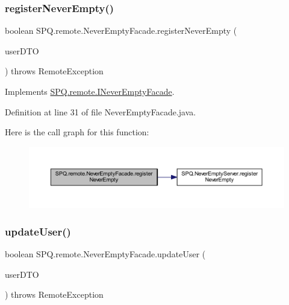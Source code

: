 \subsubsection{\texorpdfstring{register\+Never\+Empty()}{registerNeverEmpty()}}
{\footnotesize\ttfamily boolean S\+P\+Q.\+remote.\+Never\+Empty\+Facade.\+register\+Never\+Empty (\begin{DoxyParamCaption}\item[{\mbox{\hyperlink{class_s_p_q_1_1dto_1_1_user_d_t_o}{User\+D\+TO}}}]{user\+D\+TO }\end{DoxyParamCaption}) throws Remote\+Exception}



Implements \mbox{\hyperlink{interface_s_p_q_1_1remote_1_1_i_never_empty_facade_a7867e1e698fea32a535a1daeda4e8d6a}{S\+P\+Q.\+remote.\+I\+Never\+Empty\+Facade}}.



Definition at line 31 of file Never\+Empty\+Facade.\+java.

Here is the call graph for this function\+:\nopagebreak
\begin{figure}[H]
\begin{center}
\leavevmode
\includegraphics[width=350pt]{class_s_p_q_1_1remote_1_1_never_empty_facade_a52a0feff1dfb3347e55e46c3ac48fafc_cgraph}
\end{center}
\end{figure}
\mbox{\label{class_s_p_q_1_1remote_1_1_never_empty_facade_a55ad685d3c176424a7f5f18e5ebe043b}} 
\subsubsection{\texorpdfstring{update\+User()}{updateUser()}}
{\footnotesize\ttfamily boolean S\+P\+Q.\+remote.\+Never\+Empty\+Facade.\+update\+User (\begin{DoxyParamCaption}\item[{\mbox{\hyperlink{class_s_p_q_1_1dto_1_1_user_d_t_o}{User\+D\+TO}}}]{user\+D\+TO }\end{DoxyParamCaption}) throws Remote\+Exception}



